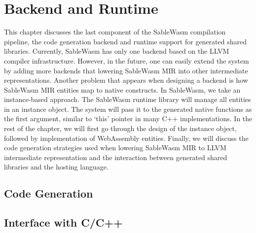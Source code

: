 \chapter{Backend and Runtime}

This chapter discusses the last component of the SableWasm compilation pipeline, the code generation backend and runtime support for generated shared libraries. Currently, SableWasm has only one backend based on the LLVM compiler infrastructure. However, in the future, one can easily extend the system by adding more backends that lowering SableWasm MIR into other intermediate representations. Another problem that appears when designing a backend is how SableWasm MIR entities map to native constructs. In SableWasm, we take an instance-based approach. The SableWasm runtime library will manage all entities in an instance object. The system will pass it to the generated native functions as the first argument, similar to `this' pointer in many C++ implementations. In the rest of the chapter, we will first go through the design of the instance object, followed by implementation of WebAssembly entities. Finally, we will discuss the code generation strategies used when lowering SableWasm MIR to LLVM intermediate representation and the interaction between generated shared libraries and the hosting language.




\section{Code Generation}

\section{Interface with C/C++}
